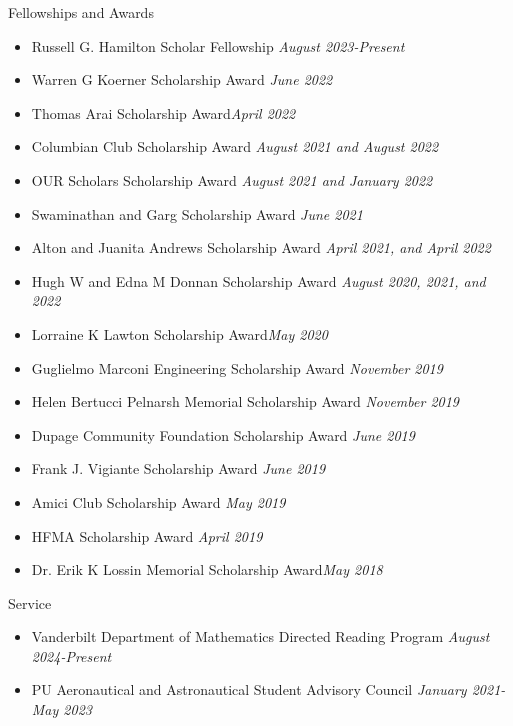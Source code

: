 \documentclass{CV} %
\begin{document}
\begin{rSection}{Fellowships and Awards}
    \begin{itemize}
        \item Russell G. Hamilton Scholar Fellowship \hfill \textit{August 2023-Present}
        \item Warren G Koerner Scholarship Award \hfill \textit{June 2022}
        \item Thomas Arai Scholarship Award\hfill \textit{April 2022}
        \item Columbian Club Scholarship Award \hfill \textit{August 2021 and August 2022}
        \item OUR Scholars Scholarship Award \hfill \textit{August 2021 and January 2022}
        \item Swaminathan and Garg Scholarship Award \hfill \textit{June 2021}
        \item Alton and Juanita Andrews Scholarship Award \hfill \textit{April 2021, and April 2022}
        \item Hugh W and Edna M Donnan Scholarship Award \hfill \textit{August 2020, 2021, and 2022}
        \item Lorraine K Lawton Scholarship Award\hfill \textit{May 2020}
        \item Guglielmo Marconi Engineering Scholarship Award \hfill \textit{November 2019}
        \item Helen Bertucci Pelnarsh Memorial Scholarship Award \hfill \textit{November 2019}
        \item Dupage Community Foundation Scholarship Award \hfill \textit{June 2019}
        \item Frank J. Vigiante Scholarship Award \hfill \textit{June 2019}
        \item Amici Club Scholarship Award \hfill \textit{May 2019}
        \item HFMA Scholarship Award \hfill \textit{April 2019}
        \item Dr. Erik K Lossin Memorial Scholarship Award\hfill \textit{May 2018}
    \end{itemize}
\end{rSection}


\begin{rSection}{Service}
    \begin{itemize}
        \item Vanderbilt Department of Mathematics Directed Reading Program \hfill \textit{August 2024-Present}
        \item PU Aeronautical and Astronautical Student Advisory Council \hfill \textit{January 2021-May 2023}
    \end{itemize}
    
\end{rSection}
\newpage
\end{document}
